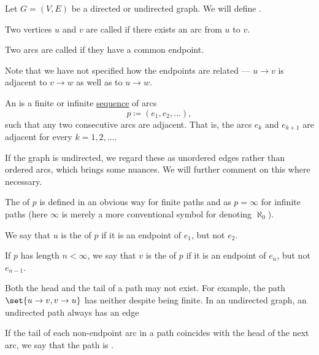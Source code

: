 \begin{definition}\label{def:graph_paths}
  Let \( G = (V, E) \) be a directed or undirected graph. We will define .

  \begin{thmenum}
     Two vertices \( u \) and \( v \)  are called  if there exists an arc from \( u \)  to \( v \).

     Two arcs are called  if they have a common endpoint.

    Note that we have not specified how the endpoints are related --- \( u \to v \) is adjacent to \( v \to w \) as well as to \( u \to w \).

     An  is a finite or infinite \hyperref[def:sequence]{sequence} of arcs
    \begin{equation*}
      p \coloneqq (e_1, e_2, \ldots),
    \end{equation*}
    such that any two consecutive arcs are adjacent. That is, the arcs \( e_k \) and \( e_{k+1} \) are adjacent for every \( k = 1, 2, \ldots \).

    If the graph is undirected, we regard these as unordered edges rather than ordered arcs, which brings some nuances. We will further comment on this where necessary.

    The  of \( p \) is defined in an obvious way for finite paths and as \( p = \infty \) for infinite paths (here \( \infty \) is merely a more conventional symbol for denoting \hyperref[thm:omega_is_a_cardinal]{\( \aleph_0 \)}).

     We say that \( u \) is the  of \( p \) if it is an endpoint of \( e_1 \), but not \( e_2 \).

    If \( p \) has length \( n < \infty \), we say that \( v \) is the  of \( p \) if it is an endpoint of \( e_n \), but not \( e_{n-1} \).

    Both the head and the tail of a path may not exist. For example, the path \( \set{ u \to v, v \to u } \) has neither despite being finite. In an undirected graph, an undirected path always has an edge

     If the tail of each non-endpoint arc in a path coincides with the head of the next arc, we say that the path is .


\end{thmenum}
\end{definition}
